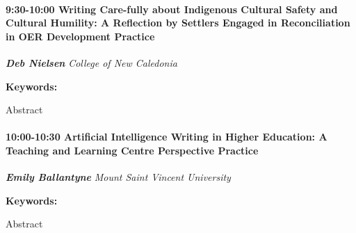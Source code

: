 \documentclass[
]{book}
\begin{document}
\begin{session}
\hypertarget{writing-care-fully-about-indigenous-cultural-safety-and-cultural-humility-a-reflection-by-settlers-engaged-in-reconciliation-in-oer-development-practice}{%
\paragraph*{\texorpdfstring{9:30-10:00 \textbar{} \textbf{Writing
Care-fully about Indigenous Cultural Safety and Cultural Humility: A
Reflection by Settlers Engaged in Reconciliation in OER Development}
\textbar{}
Practice}{9:30-10:00 \textbar{} Writing Care-fully about Indigenous Cultural Safety and Cultural Humility: A Reflection by Settlers Engaged in Reconciliation in OER Development \textbar{} Practice}}\label{writing-care-fully-about-indigenous-cultural-safety-and-cultural-humility-a-reflection-by-settlers-engaged-in-reconciliation-in-oer-development-practice}}

\textbf{\emph{Deb Nielsen}} \textbar{} \emph{College of New Caledonia}

\textbf{Keywords:}

Abstract
\end{session}
\begin{session}
\hypertarget{artificial-intelligence-writing-in-higher-education-a-teaching-and-learning-centre-perspective-practice}{%
\paragraph*{\texorpdfstring{10:00-10:30 \textbar{} \textbf{Artificial
Intelligence Writing in Higher Education: A Teaching and Learning Centre
Perspective} \textbar{}
Practice}{10:00-10:30 \textbar{} Artificial Intelligence Writing in Higher Education: A Teaching and Learning Centre Perspective \textbar{} Practice}}\label{artificial-intelligence-writing-in-higher-education-a-teaching-and-learning-centre-perspective-practice}}

\textbf{\emph{Emily Ballantyne}} \textbar{} \emph{Mount Saint Vincent
University}

\textbf{Keywords:}

Abstract
\end{session}
\end{document}
